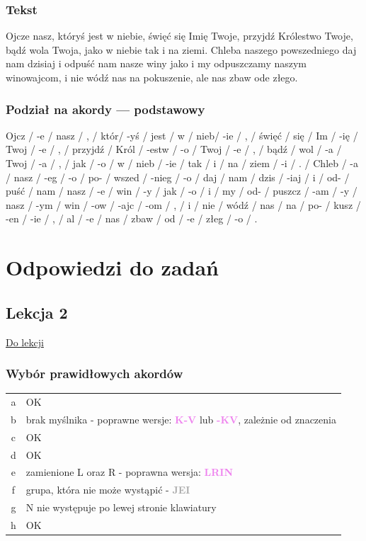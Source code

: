 \documentclass[12p, oneside]{book}
\newcommand{\steno}[1]{\textbf{\textsf{\textcolor{violet}{ #1}}}}
\newcommand{\stenoErr}[1]{\textbf{\textsf{\textcolor{darkgray}{ #1}}}}
\begin{document}
\subsection{Tekst}
Ojcze nasz, któryś jest w niebie, święć się Imię Twoje, przyjdź Królestwo Twoje, bądź wola Twoja, jako w niebie tak i na ziemi. Chleba naszego powszedniego daj nam dzisiaj i odpuść nam nasze winy jako i my odpuszczamy naszym winowajcom, i nie wódź nas na pokuszenie, ale nas zbaw ode złego.

\subsection{Podział na akordy --- podstawowy}

Ojcz / -e / nasz / , / któr/ -yś / jest / w / nieb/ -ie / , / święć / się / Im / -ię / Twoj / -e / , / przyjdź / Król / -estw / -o / Twoj / -e / , / bądź / wol / -a / Twoj / -a / , / jak / -o / w / nieb / -ie / tak / i / na / ziem / -i / . / Chleb / -a / nasz / -eg / -o / po- / wszed / -nieg / -o / daj / nam / dzis / -iaj / i / od- / puść / nam / nasz / -e / win / -y / jak / -o / i / my / od- / puszcz / -am / -y / nasz / -ym / win / -ow / -ajc / -om / , / i / nie / wódź / nas / na / po- / kusz / -en / -ie / , / al / -e / nas / zbaw / od / -e / złeg / -o / .

\chapter{Odpowiedzi do zadań}
\section{Lekcja 2}
\hyperref[prakt:2]{Do lekcji}
\label{odp:2}
\subsection*{Wybór prawidłowych akordów}
\begin{tabular}{c p{9cm}}
	a & OK \\
	b & brak myślnika - poprawne wersje: \steno{K-V} lub \steno{-KV}, zależnie od znaczenia \\
	c & OK \\
	d & OK \\
	e & zamienione L oraz R - poprawna wersja: \steno{LRIN} \\
	f & grupa, która nie może wystąpić - \stenoErr{JEI} \\
	g & N nie występuje po lewej stronie klawiatury \\
	h & OK
\end{tabular}
\end{document}
